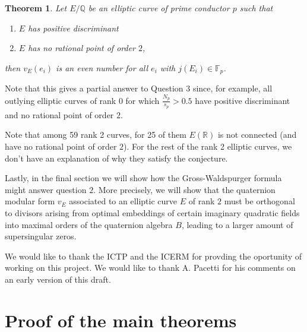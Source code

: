 \documentclass[13pt]{amsart}
\newtheorem{theorem}{Theorem}
\theoremstyle{remark}
\numberwithin{theorem}{section} \numberwithin{equation}{section}
\begin{document}
\begin{theorem} \label{thm:even}Let $E/{\mathbb{Q}}$ be an elliptic curve of prime conductor $p$ such that 
\begin{enumerate}
	\item $E$ has positive discriminant
	\item $E$ has no rational point of order $2$,
\end{enumerate}
then $v_E(e_i)$ is an even number for all $e_i$  with $j(E_i)\in {\mathbb{F}_p}$.
\end{theorem}

Note that this gives a partial answer to Question 3 since, for example, all outlying elliptic curves of rank $0$ for which $\frac{N_p}{s_p}>0.5$ have positive discriminant and no rational point of order $2$.

Note that among 59 rank 2 curves, for 25 of them $E(\mathbb{R})$ is not 
connected (and have no rational point of order $2$). For the rest of the rank 2 
elliptic curves, we don't have an explanation of why they satisfy the 
conjecture.

Lastly, in the final section we will show how the Gross-Waldspurger formula 
might answer question $2$. More precisely, we will show that the quaternion 
modular form $v_E$ associated to an elliptic curve $E$ of rank $2$ must be 
orthogonal to divisors arising from optimal embeddings of certain imaginary 
quadratic fields into maximal orders of the quaternion algebra $B$, leading to a 
larger amount of supersingular zeros.

\bigskip

 We would like to thank the ICTP and the ICERM 
for 
provding the oportunity of working on this project. We would like to thank A. 
Pacetti for his comments on an early version of this draft.

\section{Proof of the main theorems} \label{section:proofs}
\end{document}
